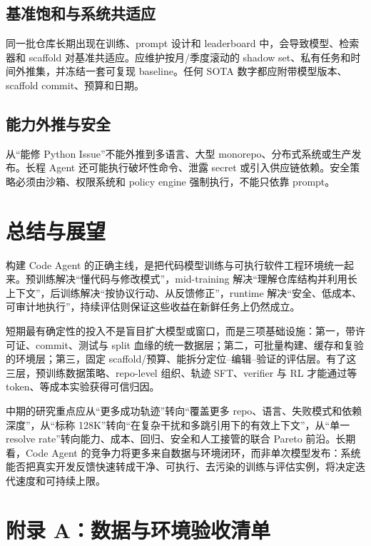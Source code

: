 \documentclass[10pt,a4paper,UTF8,fontset=none]{ctexart}
\def\BilingualAnchorPrefix{en}
\let\BilingualOriginalAppendix\appendix
\renewcommand{\appendix}{%
  \BilingualOriginalAppendix
  \renewcommand*{\theHsection}{\BilingualAnchorPrefix.appendix.\Alph{section}}%
  \renewcommand*{\theHsubsection}{\BilingualAnchorPrefix.appendix.\Alph{section}.\arabic{subsection}}%
  \renewcommand*{\theHsubsubsection}{\BilingualAnchorPrefix.appendix.\Alph{section}.\arabic{subsection}.\arabic{subsubsection}}%
}
\begin{document}
\subsection{基准饱和与系统共适应}

同一批仓库长期出现在训练、prompt 设计和 leaderboard 中，会导致模型、检索器和 scaffold 对基准共适应。应维护按月/季度滚动的 shadow set、私有任务和时间外推集，并冻结一套可复现 baseline。任何 SOTA 数字都应附带模型版本、scaffold commit、预算和日期。

\subsection{能力外推与安全}

从“能修 Python Issue”不能外推到多语言、大型 monorepo、分布式系统或生产发布。长程 Agent 还可能执行破坏性命令、泄露 secret 或引入供应链依赖。安全策略必须由沙箱、权限系统和 policy engine 强制执行，不能只依靠 prompt。

\section{总结与展望}

构建 Code Agent 的正确主线，是把代码模型训练与可执行软件工程环境统一起来。预训练解决“懂代码与修改模式”，mid-training 解决“理解仓库结构并利用长上下文”，后训练解决“按协议行动、从反馈修正”，runtime 解决“安全、低成本、可审计地执行”，持续评估则保证这些收益在新鲜任务上仍然成立。

短期最有确定性的投入不是盲目扩大模型或窗口，而是三项基础设施：第一，带许可证、commit、测试与 split 血缘的统一数据层；第二，可批量构建、缓存和复验的环境层；第三，固定 scaffold/预算、能拆分定位--编辑--验证的评估层。有了这三层，预训练数据策略、repo-level 组织、轨迹 SFT、verifier 与 RL 才能通过等 token、等成本实验获得可信归因。

中期的研究重点应从“更多成功轨迹”转向“覆盖更多 repo、语言、失败模式和依赖深度”，从“标称 128K”转向“在复杂干扰和多跳引用下的有效上下文”，从“单一 resolve rate”转向能力、成本、回归、安全和人工接管的联合 Pareto 前沿。长期看，Code Agent 的竞争力将更多来自数据与环境闭环，而非单次模型发布：系统能否把真实开发反馈快速转成干净、可执行、去污染的训练与评估实例，将决定迭代速度和可持续上限。

\clearpage
\appendix
\section{附录 A：数据与环境验收清单}
\end{document}
